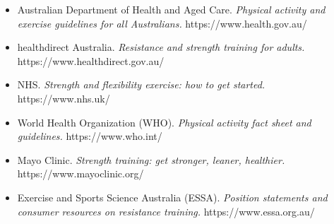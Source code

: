 \begin{itemize}
    \item Australian Department of Health and Aged Care. \textit{Physical activity and exercise guidelines for all Australians.} https://www.health.gov.au/
    \item healthdirect Australia. \textit{Resistance and strength training for adults.} https://www.healthdirect.gov.au/
    \item NHS. \textit{Strength and flexibility exercise: how to get started.} https://www.nhs.uk/
    \item World Health Organization (WHO). \textit{Physical activity fact sheet and guidelines.} https://www.who.int/
    \item Mayo Clinic. \textit{Strength training: get stronger, leaner, healthier.} https://www.mayoclinic.org/
    \item Exercise and Sports Science Australia (ESSA). \textit{Position statements and consumer resources on resistance training.} https://www.essa.org.au/
\end{itemize}

\clearpage
